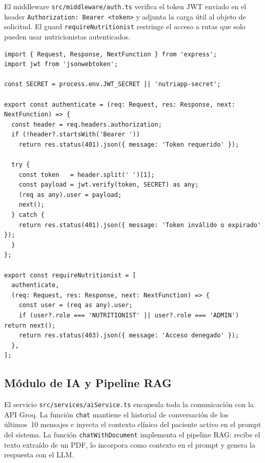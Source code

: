 \documentclass[12pt,a4paper]{article}
\begin{document}
El middleware \texttt{src/middleware/auth.ts} verifica el token JWT enviado en el
header \texttt{Authorization: Bearer <token>} y adjunta la carga útil al objeto de
solicitud. El guard \texttt{requireNutritionist} restringe el acceso a rutas que
solo pueden usar nutricionistas autenticados.

\begin{lstlisting}[caption={backend/src/middleware/auth.ts — verificación JWT},label={lst:auth}]
import { Request, Response, NextFunction } from 'express';
import jwt from 'jsonwebtoken';

const SECRET = process.env.JWT_SECRET || 'nutriapp-secret';

export const authenticate = (req: Request, res: Response, next: NextFunction) => {
  const header = req.headers.authorization;
  if (!header?.startsWith('Bearer '))
    return res.status(401).json({ message: 'Token requerido' });

  try {
    const token   = header.split(' ')[1];
    const payload = jwt.verify(token, SECRET) as any;
    (req as any).user = payload;
    next();
  } catch {
    return res.status(401).json({ message: 'Token inválido o expirado' });
  }
};

export const requireNutritionist = [
  authenticate,
  (req: Request, res: Response, next: NextFunction) => {
    const user = (req as any).user;
    if (user?.role === 'NUTRITIONIST' || user?.role === 'ADMIN') return next();
    return res.status(403).json({ message: 'Acceso denegado' });
  },
];
\end{lstlisting}

\subsection{Módulo de IA y Pipeline RAG}

El servicio \texttt{src/services/aiService.ts} encapsula toda la comunicación con
la API Groq. La función \texttt{chat} mantiene el historial de conversación de los
últimos~10 mensajes e inyecta el contexto clínico del paciente activo en el prompt
del sistema. La función \texttt{chatWithDocument} implementa el pipeline RAG:
recibe el texto extraído de un PDF, lo incorpora como contexto en el prompt y
genera la respuesta con el LLM.
\end{document}
